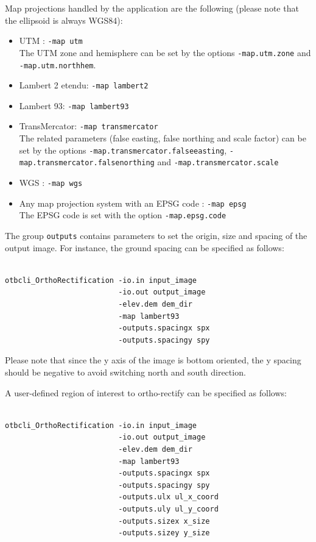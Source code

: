 Map projections handled by the application are the following
(please note that the ellipsoid is always WGS84):
\begin{itemize}
\item UTM : \verb?-map utm? \\
The UTM zone and hemisphere can be set by the options \verb?-map.utm.zone? and \verb?-map.utm.northhem?.
\item Lambert 2 etendu: \verb?-map lambert2?
\item Lambert 93: \verb?-map lambert93?
\item TransMercator: \verb?-map transmercator? \\
The related parameters (false easting, false northing and scale factor) can be set by the 
options \verb?-map.transmercator.falseeasting?, \verb?-map.transmercator.falsenorthing? and 
\verb?-map.transmercator.scale?
\item WGS : \verb?-map wgs?
\item Any map projection system with an EPSG code : \verb?-map epsg? \\
The EPSG code is set with the option \verb?-map.epsg.code?
\end{itemize}

The group \verb?outputs? contains parameters to set the origin, size and spacing of the output image.
For instance, the ground spacing can be specified as follows:

\begin{verbatim}

otbcli_OrthoRectification -io.in input_image 
                          -io.out output_image 
                          -elev.dem dem_dir 
                          -map lambert93 
                          -outputs.spacingx spx 
                          -outputs.spacingy spy

\end{verbatim}

Please note that since the y axis of the image is bottom oriented, the
y spacing should be negative to avoid switching north and south direction.

A user-defined region of interest to ortho-rectify can be specified as
follows:

\begin{verbatim}

otbcli_OrthoRectification -io.in input_image 
                          -io.out output_image 
                          -elev.dem dem_dir 
                          -map lambert93 
                          -outputs.spacingx spx 
                          -outputs.spacingy spy 
                          -outputs.ulx ul_x_coord 
                          -outputs.uly ul_y_coord 
                          -outputs.sizex x_size 
                          -outputs.sizey y_size

\end{verbatim}

